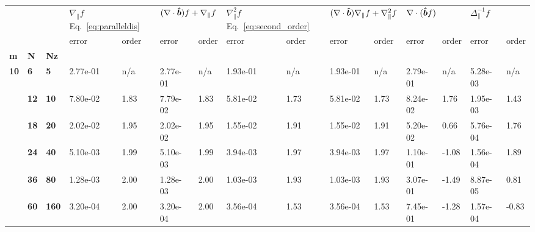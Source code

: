 \begin{tabular}{lllllllllllllll}
\toprule
  &     &     & \multicolumn{2}{l}{$\nabla_\parallel f$
  Eq.~\eqref{eq:paralleldis}} & \multicolumn{2}{l}{$(\nabla\cdot\bm{\hat{b}}) f +
  \nabla_\parallel f$} &
  \multicolumn{2}{l}{$\nabla_\parallel^2 f$ Eq.~\eqref{eq:second_order}} &
  \multicolumn{2}{l}{$(\nabla\cdot\bm{\hat{b}})\nabla_\parallel f + \nabla_\parallel^2
  f$} & \multicolumn{2}{l}{$\nabla\cdot(\bm{\hat{b}} f)$} &
  \multicolumn{2}{l}{$\Delta_\parallel^{-1}f $} \\
   &    &     &     error & order &             error & order &     error & order &     error & order &       error &  order &          error &  order \\
\textbf{m} & \textbf{N} & \textbf{Nz} &           &       &                   &       &           &       &           &       &             &        &                &        \\
\midrule
\textbf{10} & \textbf{6 } & \textbf{5  } &  2.77e-01 &   n/a &          2.77e-01 &   n/a &  1.93e-01 &   n/a &  1.93e-01 &   n/a &    2.79e-01 &    n/a &       5.28e-03 &    n/a \\
   & \textbf{12} & \textbf{10 } &  7.80e-02 &  1.83 &          7.79e-02 &  1.83 &  5.81e-02 &  1.73 &  5.81e-02 &  1.73 &    8.24e-02 &   1.76 &       1.95e-03 &   1.43 \\
   & \textbf{18} & \textbf{20 } &  2.02e-02 &  1.95 &          2.02e-02 &  1.95 &  1.55e-02 &  1.91 &  1.55e-02 &  1.91 &    5.20e-02 &   0.66 &       5.76e-04 &   1.76 \\
   & \textbf{24} & \textbf{40 } &  5.10e-03 &  1.99 &          5.10e-03 &  1.99 &  3.94e-03 &  1.97 &  3.94e-03 &  1.97 &    1.10e-01 &  -1.08 &       1.56e-04 &   1.89 \\
   & \textbf{36} & \textbf{80 } &  1.28e-03 &  2.00 &          1.28e-03 &  2.00 &  1.03e-03 &  1.93 &  1.03e-03 &  1.93 &    3.07e-01 &  -1.49 &       8.87e-05 &   0.81 \\
   & \textbf{60} & \textbf{160} &  3.20e-04 &  2.00 &          3.20e-04 &  2.00 &  3.56e-04 &  1.53 &  3.56e-04 &  1.53 &    7.45e-01 &  -1.28 &       1.57e-04 &  -0.83 \\
\bottomrule
\end{tabular}
